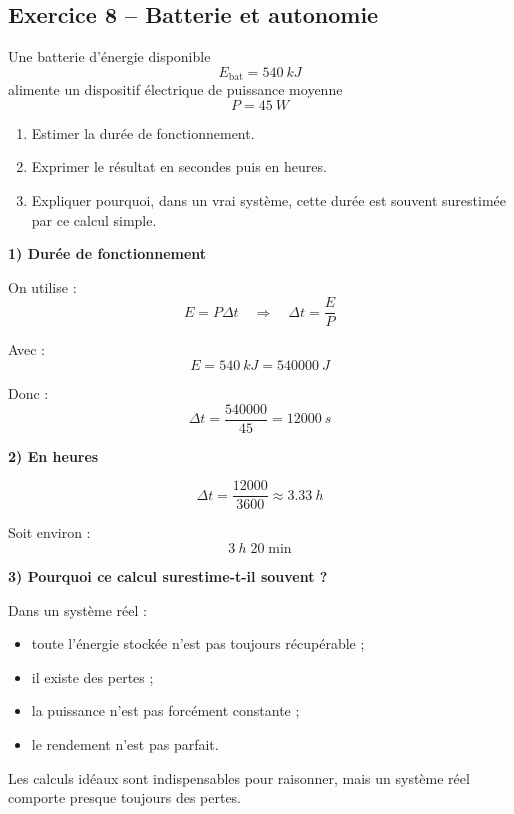 \documentclass[11pt,a4paper]{article}
\begin{document}
\subsection{Exercice 8 -- Batterie et autonomie}

\begin{enoncebox}
Une batterie d'énergie disponible
\[
E_{\text{bat}} = \SI{540}{kJ}
\]
alimente un dispositif électrique de puissance moyenne
\[
P = \SI{45}{W}
\]

\begin{enumerate}[label=\arabic*)]
    \item Estimer la durée de fonctionnement.
    \item Exprimer le résultat en secondes puis en heures.
    \item Expliquer pourquoi, dans un vrai système, cette durée est souvent surestimée par ce calcul simple.
\end{enumerate}
\end{enoncebox}

\begin{corrigebox}
\textbf{1) Durée de fonctionnement}

On utilise :
\[
E = P\Delta t \quad \Rightarrow \quad \Delta t = \frac{E}{P}
\]

Avec :
\[
E = \SI{540}{kJ} = \SI{540000}{J}
\]

Donc :
\[
\Delta t = \frac{540000}{45} = \SI{12000}{s}
\]

\textbf{2) En heures}

\[
\Delta t = \frac{12000}{3600} \approx \SI{3.33}{h}
\]

Soit environ :
\[
\SI{3}{h}\;20\;\text{min}
\]

\textbf{3) Pourquoi ce calcul surestime-t-il souvent ?}

Dans un système réel :
\begin{itemize}
    \item toute l'énergie stockée n'est pas toujours récupérable ;
    \item il existe des pertes ;
    \item la puissance n'est pas forcément constante ;
    \item le rendement n'est pas parfait.
\end{itemize}

\begin{attentionbox}
Les calculs idéaux sont indispensables pour raisonner, mais un système réel comporte presque toujours des pertes.
\end{attentionbox}
\end{corrigebox}
\end{document}
